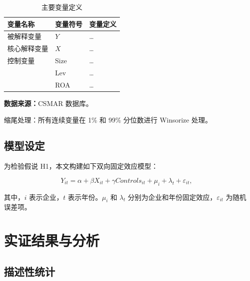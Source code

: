 \documentclass[lang=cn, alanguage={chinese}, aaffiliation={中国}, aoptions={authoryear}]{ctexart}
\begin{document}
\begin{table}[htbp]
    \centering
    \caption{主要变量定义}
    \label{tab:var_def}
    \begin{threeparttable}
        \begin{tabular}{p{2.5cm}p{2.5cm}p{5cm}}
            \toprule
            \textbf{变量名称} & \textbf{变量符号} & \textbf{变量定义} \\
            \midrule
            被解释变量 & $Y$ & \dots \\
            核心解释变量 & $X$ & \dots \\
            控制变量 & Size & \dots \\
            & Lev & \dots \\
            & ROA & \dots \\
            \bottomrule
        \end{tabular}
        \begin{tablenotes}\footnotesize
            \item \textbf{数据来源：}CSMAR 数据库。
            \item 缩尾处理：所有连续变量在 1\% 和 99\% 分位数进行 Winsorize 处理。
        \end{tablenotes}
    \end{threeparttable}
\end{table}

\subsection{模型设定}
\label{sec:model}

为检验假说 H1，本文构建如下双向固定效应模型：

\begin{equation}
    \label{eq:baseline}
    Y_{it} = \alpha + \beta X_{it} + \gamma Controls_{it} + \mu_i + \lambda_t + \varepsilon_{it},
\end{equation}

其中，$i$ 表示企业，$t$ 表示年份。$\mu_i$ 和 $\lambda_t$ 分别为企业和年份固定效应，$\varepsilon_{it}$ 为随机误差项。

\section{实证结果与分析}
\label{sec:results}

\subsection{描述性统计}
\label{sec:desc}
\end{document}
